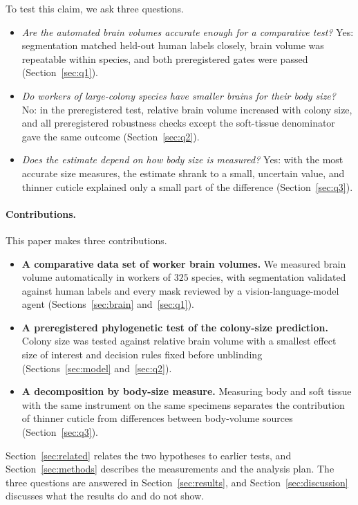 \documentclass[11pt]{article}
\begin{document}
To test this claim, we ask three questions.
\begin{itemize}
\item[\textbf{Q1}] \emph{Are the automated brain volumes accurate enough for a comparative test?} Yes: segmentation
matched held-out human labels closely, brain volume was repeatable within species, and both preregistered gates were
passed (Section~\ref{sec:q1}).
\item[\textbf{Q2}] \emph{Do workers of large-colony species have smaller brains for their body size?} No: in the
preregistered test, relative brain volume increased with colony size, and all preregistered robustness checks except
the soft-tissue denominator gave the same outcome (Section~\ref{sec:q2}).
\item[\textbf{Q3}] \emph{Does the estimate depend on how body size is measured?} Yes: with the most accurate size
measures, the estimate shrank to a small, uncertain value, and thinner cuticle explained only a small part of the
difference (Section~\ref{sec:q3}).
\end{itemize}

\paragraph{Contributions.} This paper makes three contributions.
\begin{itemize}
\item \textbf{A comparative data set of worker brain volumes.} We measured brain volume automatically in workers of
$325$ species, with segmentation validated against human labels and every mask reviewed by a vision-language-model
agent (Sections~\ref{sec:brain} and~\ref{sec:q1}).
\item \textbf{A preregistered phylogenetic test of the colony-size prediction.} Colony size was tested against relative
brain volume with a smallest effect size of interest and decision rules fixed before unblinding
(Sections~\ref{sec:model} and~\ref{sec:q2}).
\item \textbf{A decomposition by body-size measure.} Measuring body and soft tissue with the same instrument on the
same specimens separates the contribution of thinner cuticle from differences between body-volume sources
(Section~\ref{sec:q3}).
\end{itemize}

Section~\ref{sec:related} relates the two hypotheses to earlier tests, and Section~\ref{sec:methods} describes the
measurements and the analysis plan. The three questions are answered in Section~\ref{sec:results}, and
Section~\ref{sec:discussion} discusses what the results do and do not show.
\end{document}
